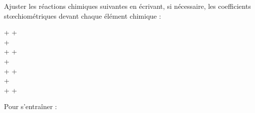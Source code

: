 \numeroQuestion
Ajuster les réactions chimiques suivantes en écrivant, si nécessaire, les coefficients stœchiométriques devant chaque élément chimique :
\newcommand{\localEcart}{16}
\begin{center}
   \sol +  \aq
  \reaction {} \ionFerII\aq +  \gaz
  \\[\localEcart pt]
   \sol +  \dioxygene\gaz
  \reaction {} \sol
  \\[\localEcart pt]
   \liq +  \dioxygene\gaz
  \reaction {} \dioxydeDeCarbone\gaz +  \eau\liq
  \\[\localEcart pt]
   \aq +  \aq
  \reaction {} \sol
  \\[\localEcart pt]
   \sol +  \eau\liq +  \dioxygene\gaz
  \reaction {} \sol
  \\[\localEcart pt]
   \sol
  \reaction {} \sol +  \eau\liq
  \\[\localEcart pt]
   \sol +  \eau\liq +  \dioxygene\gaz
  \reaction {} \sol
  \\[\localEcart pt]
\end{center}

\telechargement Pour s'entraîner :